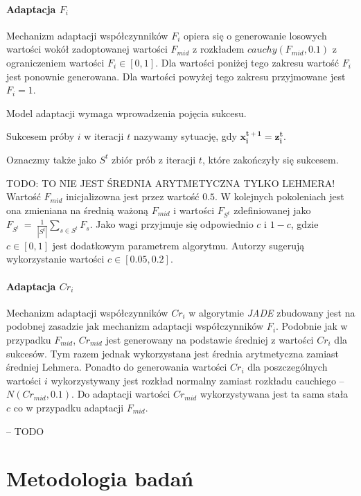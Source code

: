\documentclass[12pt,a4paper]{report}
\begin{document}
{{{\begin{description}
\subsubsection{Adaptacja $F_i$}
\par{
Mechanizm adaptacji współczynników $F_i$ opiera się o generowanie losowych wartości wokół zadoptowanej wartości $F_{mid}$ z rozkładem $cauchy(F_{mid}, 0.1)$ z ograniczeniem wartości $F_i \in [0, 1]$. Dla wartości poniżej tego zakresu wartość $F_i$ jest ponownie generowana. Dla wartości powyżej tego zakresu przyjmowane jest $F_i = 1$.
}
\par{
Model adaptacji wymaga wprowadzenia pojęcia sukcesu.
\par{
\begin{OptDefinition}
Sukcesem próby $i$ w iteracji $t$ nazywamy sytuację, gdy $\mathbf{x_i^{t+1} = z_i^t}$.
\end{OptDefinition}
}
Oznaczmy także jako $S^t$ zbiór prób z iteracji $t$, które zakończyły się sukcesem.
}
\par{
TODO: TO NIE JEST ŚREDNIA ARYTMETYCZNA TYLKO LEHMERA!
Wartość $F_{mid}$ inicjalizowna jest przez wartość $0.5$. W kolejnych pokoleniach jest ona zmieniana na średnią ważoną $F_{mid}$ i wartości $F_{S^t}$ zdefiniowanej jako $F_{S^t}~=~\frac{1}{|S^t|}\sum_{s \in S^t} F_s$. Jako wagi przyjmuje się odpowiednio $c$ i $1 - c$, gdzie $c \in [0,1]$ jest dodatkowym parametrem algorytmu. Autorzy \cite{JADE} sugerują wykorzystanie wartości $c \in [0.05, 0.2]$.
}

\subsubsection{Adaptacja $Cr_i$}
\par{
Mechanizm adaptacji współczynników $Cr_i$ w algorytmie \emph{JADE} zbudowany jest na podobnej zasadzie jak mechanizm adaptacji współczynników $F_i$. Podobnie jak w przypadku $F_{mid}$, $Cr_{mid}$ jest generowany na podstawie średniej z wartości $Cr_i$ dla sukcesów. Tym razem jednak wykorzystana jest średnia arytmetyczna zamiast średniej Lehmera. Ponadto do generowania wartości $Cr_i$ dla poszczególnych wartości $i$ wykorzystywany jest rozkład normalny zamiast rozkładu cauchiego -- $N(Cr_{mid}, 0.1)$. Do adaptacji wartości $Cr_{mid}$ wykorzystywana jest ta sama stała $c$ co w przypadku adaptacji $F_{mid}$.
}
\item[SHADE] -- TODO
\end{description}

\chapter{Metodologia badań}
}}}
\end{document}

